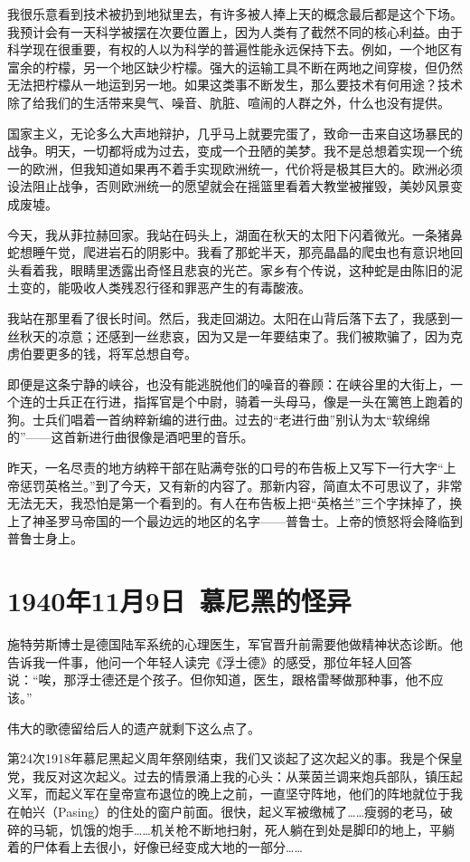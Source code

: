 \documentclass[UTF8]{ctexart}
\begin{document}
我很乐意看到技术被扔到地狱里去，有许多被人捧上天的概念最后都是这个下场。我预计会有一天科学被摆在次要位置上，因为人类有了截然不同的核心利益。由于科学现在很重要，有权的人以为科学的普遍性能永远保持下去。例如，一个地区有富余的柠檬，另一个地区缺少柠檬。强大的运输工具不断在两地之间穿梭，但仍然无法把柠檬从一地运到另一地。如果这类事不断发生，那么要技术有何用途？技术除了给我们的生活带来臭气、噪音、肮脏、喧闹的人群之外，什么也没有提供。

国家主义，无论多么大声地辩护，几乎马上就要完蛋了，致命一击来自这场暴民的战争。明天，一切都将成为过去，变成一个丑陋的美梦。我不是总想着实现一个统一的欧洲，但我知道如果再不着手实现欧洲统一，代价将是极其巨大的。欧洲必须设法阻止战争，否则欧洲统一的愿望就会在摇篮里看着大教堂被摧毁，美妙风景变成废墟。

今天，我从菲拉赫回家。我站在码头上，湖面在秋天的太阳下闪着微光。一条猪鼻蛇想睡午觉，爬进岩石的阴影中。我看了那蛇半天，那亮晶晶的爬虫也有意识地回头看着我，眼睛里透露出奇怪且悲哀的光芒。家乡有个传说，这种蛇是由陈旧的泥土变的，能吸收人类残忍行径和罪恶产生的有毒酸液。

我站在那里看了很长时间。然后，我走回湖边。太阳在山背后落下去了，我感到一丝秋天的凉意；还感到一丝悲哀，因为又是一年要结束了。我们被欺骗了，因为克虏伯要更多的钱，将军总想自夸。

即便是这条宁静的峡谷，也没有能逃脱他们的噪音的眷顾：在峡谷里的大街上，一个连的士兵正在行进，指挥官是个中尉，骑着一头母马，像是一头在篱笆上跑着的狗。士兵们唱着一首纳粹新编的进行曲。过去的“老进行曲”别认为太“软绵绵的”——这首新进行曲很像是酒吧里的音乐。

昨天，一名尽责的地方纳粹干部在贴满夸张的口号的布告板上又写下一行大字“上帝惩罚英格兰。”到了今天，又有新的内容了。那新内容，简直太不可思议了，非常无法无天，我恐怕是第一个看到的。有人在布告板上把“英格兰”三个字抹掉了，换上了神圣罗马帝国的一个最边远的地区的名字——普鲁士。上帝的愤怒将会降临到普鲁士身上。

\section{1940年11月9日\ 慕尼黑的怪异}

施特劳斯博士是德国陆军系统的心理医生，军官晋升前需要他做精神状态诊断。他告诉我一件事，他问一个年轻人读完《浮士德》的感受，那位年轻人回答说：“唉，那浮士德还是个孩子。但你知道，医生，跟格雷琴做那种事，他不应该。”

伟大的歌德留给后人的遗产就剩下这么点了。

第24次1918年慕尼黑起义周年祭刚结束，我们又谈起了这次起义的事。我是个保皇党，我反对这次起义。过去的情景涌上我的心头：从莱茵兰调来炮兵部队，镇压起义军，而起义军在皇帝宣布退位的晚上之前，一直坚守阵地，他们的阵地就位于我在帕兴（Pasing）的住处的窗户前面。很快，起义军被缴械了……瘦弱的老马，破碎的马轭，饥饿的炮手……机关枪不断地扫射，死人躺在到处是脚印的地上，平躺着的尸体看上去很小，好像已经变成大地的一部分……
\end{document}
